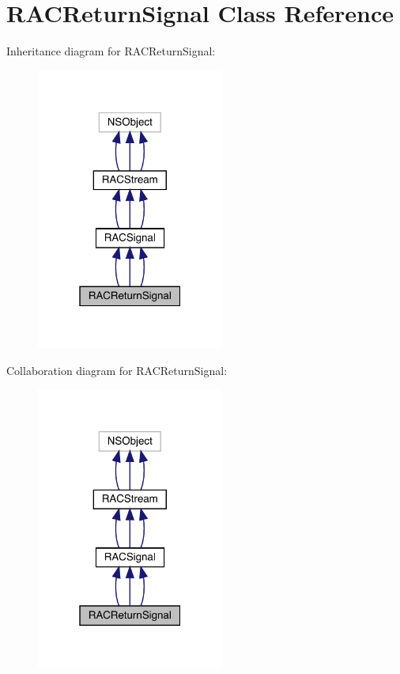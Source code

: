 \hypertarget{interface_r_a_c_return_signal}{}\section{R\+A\+C\+Return\+Signal Class Reference}
\label{interface_r_a_c_return_signal}


Inheritance diagram for R\+A\+C\+Return\+Signal\+:\nopagebreak
\begin{figure}[H]
\begin{center}
\leavevmode
\includegraphics[width=175pt]{interface_r_a_c_return_signal__inherit__graph}
\end{center}
\end{figure}


Collaboration diagram for R\+A\+C\+Return\+Signal\+:\nopagebreak
\begin{figure}[H]
\begin{center}
\leavevmode
\includegraphics[width=175pt]{interface_r_a_c_return_signal__coll__graph}
\end{center}
\end{figure}
